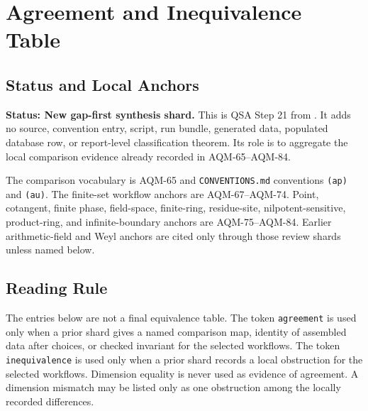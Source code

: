 
\section{Agreement and Inequivalence Table}
\label{sec:qsa-agreement-inequivalence-table}

\subsection{Status and Local Anchors}

\textbf{Status: New gap-first synthesis shard.}  This is QSA Step 21 from
.  It adds no source,
convention entry, script, run bundle, generated data, populated database row,
or report-level classification theorem.  Its role is to aggregate the local
comparison evidence already recorded in AQM-65--AQM-84.

The comparison vocabulary is AQM-65 and \texttt{CONVENTIONS.md} conventions
\texttt{(ap)} and \texttt{(au)}.  The finite-set workflow anchors are
AQM-67--AQM-74.  Point, cotangent, finite phase, field-space, finite-ring,
residue-site, nilpotent-sensitive, product-ring, and infinite-boundary
anchors are AQM-75--AQM-84.  Earlier arithmetic-field and Weyl anchors are
cited only through those review shards unless named below.

\subsection{Reading Rule}

The entries below are not a final equivalence table.  The token
\texttt{agreement} is used only when a prior shard gives a named comparison
map, identity of assembled data after choices, or checked invariant for the
selected workflows.  The token \texttt{inequivalence} is used only when a
prior shard records a local obstruction for the selected workflows.  Dimension
equality is never used as evidence of agreement.  A dimension mismatch may be
listed only as one obstruction among the locally recorded differences.

